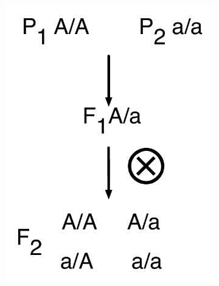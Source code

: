 \begin{figure}
  \centering
   \begin{subfigure}{0.45\textwidth}
   \caption{}
   \label{fig:yr15:f2schematic}
   \centering
   \includegraphics[height=0.3\textheight]{Yr15/Figures/population/F2schematic.pdf}
  \end{subfigure}
  ~
   \begin{subfigure}{0.5\textwidth}
   \caption{}
   \label{fig:yr15:BSAschematic}
   \centering

\end{subfigure}
\end{figure}
